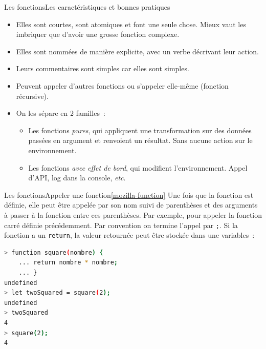\documentclass{beamer}
\begin{document}
\begin{frame}{Les fonctions}{Les caractéristiques et bonnes pratiques}
    \begin{itemize}
        \item Elles sont courtes, sont atomiques et font une seule chose. Mieux vaut les
              imbriquer que d'avoir une grosse fonction complexe.
        \item Elles sont nommées de manière explicite, avec un verbe décrivant leur action.
        \item Leurs commentaires sont simples car elles sont simples.
        \item Peuvent appeler d'autres fonctions ou s'appeler elle-même (fonction récursive).
        \item On les sépare en 2 familles~:
              \begin{itemize}
                  \item Les fonctions \textit{pures}, qui appliquent une transformation sur des données
                        passées en argument et renvoient un résultat. Sans aucune action sur le
                        environnement.
                  \item Les fonctions \textit{avec effet de bord}, qui modifient l'environnement. Appel
                        d'API, log dans la console, \textit{etc}.
              \end{itemize}
    \end{itemize}
\end{frame}

\begin{frame}[fragile]{Les fonctions}{Appeler une fonction\cref{mozilla-function}}
    Une fois que la fonction est définie, elle peut être appelée par son nom suivi de parenthèses et des arguments à passer à la fonction entre ces parenthèses.
    Par exemple, pour appeler la fonction carré définie précédemment.
    Par convention on termine l'appel par \lstinline{;}.
    Si la fonction a un \lstinline{return}, la valeur retournée peut être stockée dans une variables~:
    \begin{lstlisting}[language=Bash,title={\scriptsize{Node.js}}]
> function square(nombre) {
    ... return nombre * nombre;
    ... }
undefined
> let twoSquared = square(2);
undefined
> twoSquared
4
> square(2);
4
        \end{lstlisting}
\end{frame}
\end{document}
